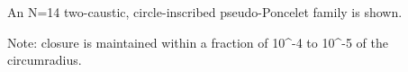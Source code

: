 An N=14 two-caustic, circle-inscribed pseudo-Poncelet family is shown.

Note: closure is maintained within a fraction of 10^-4 to 10^-5 of the circumradius.